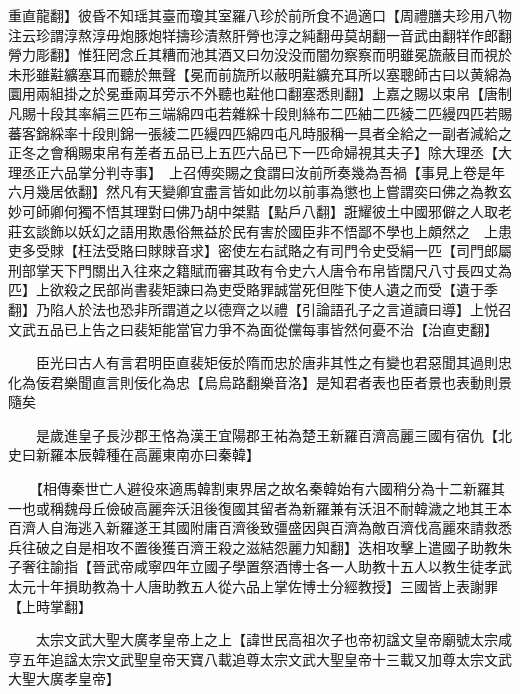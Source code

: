 重直龍翻】彼昏不知瑶其臺而瓊其室羅八珍於前所食不過適口【周禮膳夫珍用八物注云珍謂淳熬淳毋炮豚炮䍧擣珍漬熬肝膋也淳之純翻毋莫胡翻一音武由翻䍧作郎翻膋力彫翻】惟狂罔念丘其糟而池其酒又曰勿没没而闇勿察察而明雖冕旒蔽目而視於未形雖黈纊塞耳而聽於無聲【冕而前旒所以蔽明黈纊充耳所以塞聰師古曰以黄綿為圜用兩組掛之於冕垂兩耳旁示不外聽也黈他口翻塞悉則翻】上嘉之賜以束帛【唐制凡賜十段其率絹三匹布三端綿四屯若雜綵十段則絲布二匹紬二匹綾二匹縵四匹若賜蕃客錦綵率十段則錦一張綾二匹縵四匹綿四屯凡時服稱一具者全給之一副者減給之正冬之會稱賜束帛有差者五品已上五匹六品已下一匹命婦視其夫子】除大理丞【大理丞正六品掌分判寺事】　上召傅奕賜之食謂曰汝前所奏幾為吾禍【事見上卷是年六月幾居依翻】然凡有天變卿宜盡言皆如此勿以前事為懲也上嘗謂奕曰佛之為教玄妙可師卿何獨不悟其理對曰佛乃胡中桀黠【點戶八翻】誑耀彼土中國邪僻之人取老莊玄談飾以妖幻之語用欺愚俗無益於民有害於國臣非不悟鄙不學也上頗然之　上患吏多受賕【枉法受賂曰賕賕音求】密使左右試賂之有司門令史受絹一匹【司門郎屬刑部掌天下門關出入往來之籍賦而審其政有令史六人唐令布帛皆闊尺八寸長四丈為匹】上欲殺之民部尚書裴矩諫曰為吏受賂罪誠當死但陛下使人遺之而受【遺于季翻】乃陷人於法也恐非所謂道之以德齊之以禮【引論語孔子之言道讀曰導】上悦召文武五品已上告之曰裴矩能當官力爭不為面從儻每事皆然何憂不治【治直吏翻】

　　臣光曰古人有言君明臣直裴矩佞於隋而忠於唐非其性之有變也君惡聞其過則忠化為佞君樂聞直言則佞化為忠【烏烏路翻樂音洛】是知君者表也臣者景也表動則景隨矣

　　是歲進皇子長沙郡王恪為漢王宜陽郡王祐為楚王新羅百濟高麗三國有宿仇【北史曰新羅本辰韓種在高麗東南亦曰秦韓】

　　【相傳秦世亡人避役來適馬韓割東界居之故名秦韓始有六國稍分為十二新羅其一也或稱魏母丘儉破高麗奔沃沮後復國其留者為新羅兼有沃沮不耐韓濊之地其王本百濟人自海逃入新羅遂王其國附庸百濟後致彊盛因與百濟為敵百濟伐高麗來請救悉兵往破之自是相攻不置後獲百濟王殺之滋結怨麗力知翻】迭相攻擊上遣國子助教朱子奢往諭指【晉武帝咸寧四年立國子學置祭酒博士各一人助教十五人以教生徒孝武太元十年損助教為十人唐助教五人從六品上掌佐博士分經教授】三國皆上表謝罪【上時掌翻】

　　太宗文武大聖大廣孝皇帝上之上【諱世民高祖次子也帝初諡文皇帝廟號太宗咸亨五年追諡太宗文武聖皇帝天寶八載追尊太宗文武大聖皇帝十三載又加尊太宗文武大聖大廣孝皇帝】

